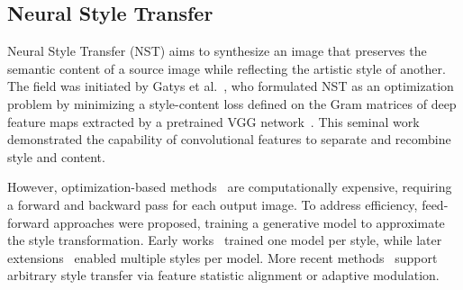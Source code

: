\documentclass[letterpaper]{article} %
\begin{document}


\subsection{Neural Style Transfer}

Neural Style Transfer (NST) aims to synthesize an image that preserves the semantic content of a source image while reflecting the artistic style of another. The field was initiated by Gatys et al.~\cite{gatys2016image}, who formulated NST as an optimization problem by minimizing a style-content loss defined on the Gram matrices of deep feature maps extracted by a pretrained VGG network~\cite{25simonyan2014very}. This seminal work demonstrated the capability of convolutional features to separate and recombine style and content.

However, optimization-based methods~\cite{li2016combining, berger2016incorporating, risser2017stable} are computationally expensive, requiring a forward and backward pass for each output image. To address efficiency, feed-forward approaches were proposed, training a generative model to approximate the style transformation. Early works~\cite{johnson2016perceptual, ulyanov2016texture} trained one model per style, while later extensions~\cite{dumoulin2016learned, chen2017stylebank} enabled multiple styles per model. More recent methods~\cite{huang2017arbitrary, xu2021drb, kwon2024aesfa} support arbitrary style transfer via feature statistic alignment or adaptive modulation.
\end{document}
